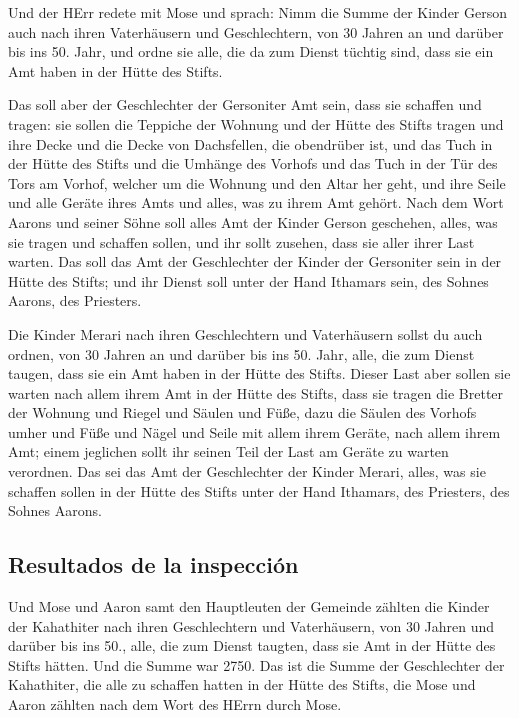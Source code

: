  Und der HErr redete mit Mose und sprach: 
Nimm die Summe der Kinder Gerson auch nach ihren Vaterhäusern und
Geschlechtern,  von 30 Jahren an und darüber bis ins 50.
Jahr, und ordne sie alle, die da zum Dienst tüchtig sind, dass sie ein
Amt haben in der Hütte des Stifts.

 Das soll aber der Geschlechter der Gersoniter Amt sein,
dass sie schaffen und tragen:  sie sollen die Teppiche
der Wohnung und der Hütte des Stifts tragen und ihre Decke und die Decke
von Dachsfellen, die obendrüber ist, und das Tuch in der Hütte des
Stifts  und die Umhänge des Vorhofs und das Tuch in der
Tür des Tors am Vorhof, welcher um die Wohnung und den Altar her geht,
und ihre Seile und alle Geräte ihres Amts und alles, was zu ihrem Amt
gehört.  Nach dem Wort Aarons und seiner Söhne soll alles
Amt der Kinder Gerson geschehen, alles, was sie tragen und schaffen
sollen, und ihr sollt zusehen, dass sie aller ihrer Last warten.
 Das soll das Amt der Geschlechter der Kinder der
Gersoniter sein in der Hütte des Stifts; und ihr Dienst soll unter der
Hand Ithamars sein, des Sohnes Aarons, des Priesters.

 Die Kinder Merari nach ihren Geschlechtern und
Vaterhäusern sollst du auch ordnen,  von 30 Jahren an und
darüber bis ins 50. Jahr, alle, die zum Dienst taugen, dass sie ein Amt
haben in der Hütte des Stifts.  Dieser Last aber sollen
sie warten nach allem ihrem Amt in der Hütte des Stifts, dass sie tragen
die Bretter der Wohnung und Riegel und Säulen und Füße, 
dazu die Säulen des Vorhofs umher und Füße und Nägel und Seile mit allem
ihrem Geräte, nach allem ihrem Amt; einem jeglichen sollt ihr seinen
Teil der Last am Geräte zu warten verordnen.  Das sei das
Amt der Geschlechter der Kinder Merari, alles, was sie schaffen sollen
in der Hütte des Stifts unter der Hand Ithamars, des Priesters, des
Sohnes Aarons.

\hypertarget{resultados-de-la-inspecciuxf3n}{%
\subsection{Resultados de la
inspección}\label{resultados-de-la-inspecciuxf3n}}

 Und Mose und Aaron samt den Hauptleuten der Gemeinde
zählten die Kinder der Kahathiter nach ihren Geschlechtern und
Vaterhäusern,  von 30 Jahren und darüber bis ins 50.,
alle, die zum Dienst taugten, dass sie Amt in der Hütte des Stifts
hätten.  Und die Summe war 2750.  Das ist
die Summe der Geschlechter der Kahathiter, die alle zu schaffen hatten
in der Hütte des Stifts, die Mose und Aaron zählten nach dem Wort des
HErrn durch Mose.

